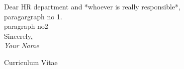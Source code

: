 \documentclass[11pt]{developercv} %
\begin{document}

Dear HR department and *whoever is really responsible*,\\

paragargraph
no 1.\\


paragraph no2\\

\vspace{3.0mm}
Sincerely,
\vspace{1.0mm}\\
\textit{Your Name}

\vfill


Curriculum Vitae


\end{document}
